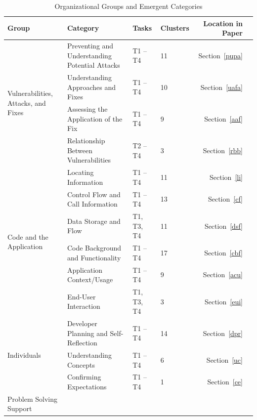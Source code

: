 \documentclass[10pt,journal,compsoc]{IEEEtran}
\begin{document}
\begin{table} 
	\centering
	\caption{Organizational Groups and Emergent Categories}
	\begin{tabularx}{\textwidth}{|l|X|l|l|r|c|}
		\rowcolor{gray!50}
		\hline
		Group											& Category										&Tasks & Clusters		& Location in Paper	  	\\
		\hline			
		\multirow{4}{*}{Vulnerabilities, Attacks, and Fixes}
		& Preventing and Understanding Potential Attacks	& T1 -- T4 & 11     		& Section~\ref{pupa}		\\
		
		& Understanding Approaches and Fixes 	& T1 -- T4 & 10     		& Section~\ref{uafa}	\\
		
		& Assessing the Application of the Fix				& T1 -- T4 & 9     		& Section~\ref{aaf}				\\
		
		& Relationship Between Vulnerabilities							& T2 -- T4 & 3     		& Section~\ref{rbb}			\\
		\hline
		\multirow{6}{*}{Code and the Application}	
		& Locating Information 								& T1 -- T4 & 11      		& Section~\ref{li}		\\
		
		& Control Flow and Call Information					& T1 -- T4 & 13     		& Section~\ref{cf}	\\
		
		& Data Storage and Flow								& T1, T3, T4 & 11     		& Section~\ref{dsf}  	\\
		
		& Code Background and Functionality	 				& T1 -- T4 & 17     		& Section~\ref{cbf}			\\
		
		& Application Context/Usage										& T1 -- T4 & 9     		& Section~\ref{acu}			\\
		
		& End-User Interaction											& T1, T3, T4 & 3     		& Section~\ref{eui}		\\
		\hline	
		\multirow{3}{*}{Individuals}	
		& Developer Planning and Self-Reflection						& T1 -- T4 & 14    		& Section~\ref{dpr}		\\
		
		& Understanding Concepts										& T1 -- T4 & 6 			& Section~\ref{uc}			\\
		
		& Confirming Expectations					 					& T1 -- T4 & 1				& Section~\ref{ce}  \\
		\hline
		\multirow{4}{*}{Problem Solving Support}
		

\end{tabularx}
\end{table}
\end{document}
